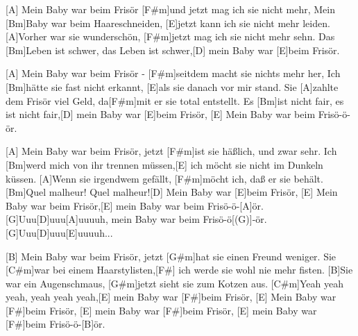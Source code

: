 

\begin{spacing}{0.99}
\begin{guitar}
	[A] Mein Baby war beim Frisör [F#m]und jetzt mag ich sie nicht mehr,
	Mein [Bm]Baby war beim Haareschneiden, [E]jetzt kann ich sie nicht mehr leiden.
	[A]Vorher war sie wunderschön, [F#m]jetzt mag ich sie nicht mehr sehn.
	Das [Bm]Leben ist schwer, das Leben ist schwer,[D] mein Baby war [E]beim Frisör.\vspace*{-.1em}
	
	[A] Mein Baby war beim Frisör - [F#m]seitdem macht sie nichts mehr her,
	Ich [Bm]hätte sie fast nicht erkannt, [E]als sie danach vor mir stand.
	Sie [A]zahlte dem Frisör viel Geld, da[F#m]mit er sie total entstellt.
	Es [Bm]ist nicht fair, es ist nicht fair,[D] mein Baby war [E]beim Frisör,
	[E] Mein Baby war beim Frisö-ö-ör.\vspace*{-.1em}
	
	[A] Mein Baby war beim Frisör, jetzt [F#m]ist sie häßlich, und zwar sehr.
	Ich [Bm]werd mich von ihr trennen müssen,[E] ich möcht sie nicht im Dunkeln küssen.
	[A]Wenn sie irgendwem gefällt, [F#m]möcht ich, daß er sie behält.
	[Bm]Quel malheur! Quel malheur![D] Mein Baby war [E]beim Frisör,
	[E] Mein Baby war beim Frisör,[E] mein Baby war beim Frisö-ö-[A]{ö}r.
	[G]Uuu[D]uuu[A]uuuuh, mein Baby war beim Frisö-ö[(G)]-ör. 
	[G]Uuu[D]uuu[E]uuuuh...\vspace*{-.1em}
	
	[B] Mein Baby war beim Frisör, jetzt [G#m]hat sie einen Freund weniger.
	Sie [C#m]war bei einem Haarstylisten,[F#] ich werde sie wohl nie mehr fisten.
	[B]Sie war ein Augenschmaus, [G#m]jetzt sieht sie zum Kotzen aus. 
	[C#m]Yeah yeah yeah, yeah yeah yeah,[E] mein Baby war [F#]beim Frisör,
	[E] Mein Baby war [F#]beim Frisör, [E] mein Baby war [F#]beim Frisör,
	[E] mein Baby war [F#]beim Frisö-ö-[B]{ö}r.\hfill\end{guitar}
\end{spacing}